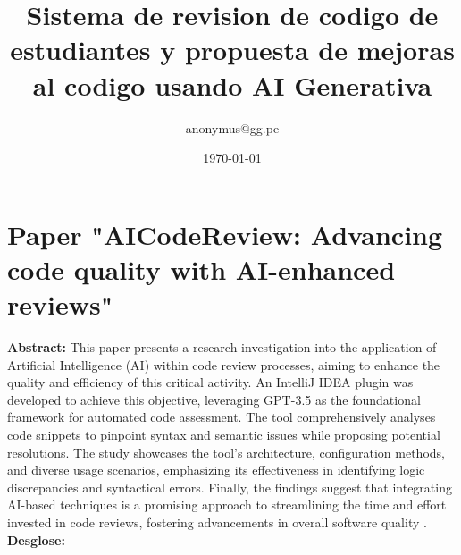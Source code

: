 \documentclass{article}
\title{Sistema de revision de codigo de estudiantes y propuesta de mejoras al codigo usando AI Generativa}
\author{anonymus@gg.pe}
\date{\today}
\begin{document}
\maketitle

\newpage
\tableofcontents
\newpage





\section{Paper "AICodeReview: Advancing code quality with AI-enhanced reviews"}

\textbf{Abstract:} This paper presents a research investigation into the application of Artificial Intelligence (AI) within code review processes, aiming to enhance the quality and efficiency of this critical activity. An IntelliJ IDEA plugin was developed to achieve this objective, leveraging GPT-3.5 as the foundational framework for automated code assessment. The tool comprehensively analyses code snippets to pinpoint syntax and semantic issues while proposing potential resolutions. The study showcases the tool's architecture, configuration methods, and diverse usage scenarios, emphasizing its effectiveness in identifying logic discrepancies and syntactical errors. Finally, the findings suggest that integrating AI-based techniques is a promising approach to streamlining the time and effort invested in code reviews, fostering advancements in overall software quality \cite{ALMEIDA2024101677}. \\

\textbf{Desglose:}
\end{document}

